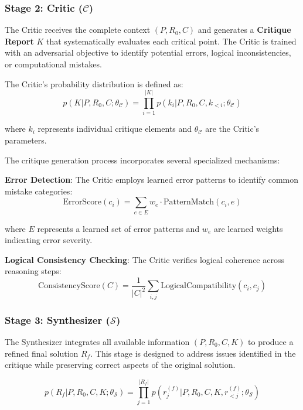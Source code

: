 \documentclass[10pt,twocolumn]{article}
\newcommand{\Critic}{\mathcal{C}}
\newcommand{\Synthesizer}{\mathcal{S}}
\begin{document}
\subsubsection{Stage 2: Critic ($\Critic$)}

The Critic receives the complete context $(P, R_0, C)$ and generates a \textbf{Critique Report} $K$ that systematically evaluates each critical point. The Critic is trained with an adversarial objective to identify potential errors, logical inconsistencies, or computational mistakes.

The Critic's probability distribution is defined as:
\begin{equation}
p(K | P, R_0, C; \theta_{\Critic}) = \prod_{i=1}^{|K|} p(k_i | P, R_0, C, k_{<i}; \theta_{\Critic})
\end{equation}

where $k_i$ represents individual critique elements and $\theta_{\Critic}$ are the Critic's parameters.

The critique generation process incorporates several specialized mechanisms:

\textbf{Error Detection}: The Critic employs learned error patterns to identify common mistake categories:
\begin{equation}
\text{ErrorScore}(c_i) = \sum_{e \in E} w_e \cdot \text{PatternMatch}(c_i, e)
\end{equation}

where $E$ represents a learned set of error patterns and $w_e$ are learned weights indicating error severity.

\textbf{Logical Consistency Checking}: The Critic verifies logical coherence across reasoning steps:
\begin{equation}
\text{ConsistencyScore}(C) = \frac{1}{|C|^2} \sum_{i,j} \text{LogicalCompatibility}(c_i, c_j)
\end{equation}

\subsubsection{Stage 3: Synthesizer ($\Synthesizer$)}

The Synthesizer integrates all available information $(P, R_0, C, K)$ to produce a refined final solution $R_f$. This stage is designed to address issues identified in the critique while preserving correct aspects of the original solution.

\begin{equation}
p(R_f | P, R_0, C, K; \theta_{\Synthesizer}) = \prod_{j=1}^{|R_f|} p(r_j^{(f)} | P, R_0, C, K, r_{<j}^{(f)}; \theta_{\Synthesizer})
\end{equation}
\end{document}
